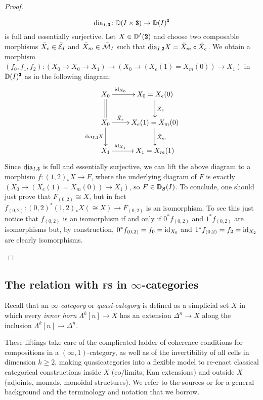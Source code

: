\begin{proof}
\begin{enumerate}
\[
\dia_{I,\tre}\colon \D(I\times \tre)\to \D(I)^{\tre}
\]
is full and essentially surjective. Let $X\in \D^I(\due)$ and choose two composable morphisms $\bar X_e\in \bar {\mathcal{E}}_I$ and $\bar X_m\in \bar {\mathcal{M}}_I$ such that $\dia_{I,\due}X=\bar X_m\circ \bar X_e$. We obtain a morphism $(f_0,f_1,f_2)\colon (X_0\to X_0\to X_1)\to (X_0\to (X_e(1)=X_m(0))\to X_1)$ in $\D(I)^{\tre}$ as in the following diagram:
\[
\xymatrix{
X_0\ar@{=}[d]\ar[r]^(.3){\id_{X_0}}&X_0= X_e(0)\ar[d]^{\bar X_e}\\
X_0\ar[r]^(.3){\bar X_e}\ar[d]_{\dia_{I,\due}X}&X_e(1)=X_m(0)\ar[d]^{\bar X_m}\\
X_1\ar[r]^(.3){\id_{X_1}}&X_1=X_m(1)
}
\]
Since $\dia_{I,\tre}$ is full and essentially surjective, we can lift the above diagram to a morphism $f\colon (1,2)_*X\to F$, where the underlying diagram of $F$ is exactly $(X_0\to (X_e(1)=X_m(0))\to X_1)$, so $F\in \mathbb{D}_{\mathfrak{F}}(I)$. To conclude, one should just prove that $F_{(0,2)}\cong X$, but in fact $f_{(0,2)}\colon (0,2)^*(1,2)_*X(\cong X)\to F_{(0,2)}$ is an isomorphism. To see this just notice that $f_{(0,2)}$ is an isomorphism if and only if $0^*f_{(0,2)}$ and $1^*f_{(0,2)}$ are isomorphisms but, by construction, $0^*f_{(0,2)}=f_0=\operatorname{id}_{X_0}$ and $1^*f_{(0,2)}=f_2=\operatorname{id}_{X_2}$ are clearly isomorphisms.\qedhere
\end{enumerate}
\end{proof}


\subsection{The relation with \textsc{fs} in $\infty$-categories} \label{infty_cat_fs}
Recall that an \emph{$\infty$-category} \cite{HTT} or \emph{quasi-category} \cite{joyal2008notes} is defined as a simplicial set $X$ in which every \emph{inner horn} $\Lambda^k[n] \to X$ has an extension $\Delta^n \to X$ along the inclusion $\Lambda^k[n]\to \Delta^n$. 

These liftings take care of the complicated ladder of coherence conditions for compositions in a $(\infty,1)$-category, as well as of the invertibility of all cells in dimension $k\ge 2$, making quasicategories into a flexible model to re-enact classical categorical constructions inside $X$ (co/limits, Kan extensions) and outside $X$ (adjoints, monads, monoidal structures). We refer to the sources \cite{HTT} or \cite{joyal2008notes} for a general background and the terminology and notation that we borrow.

